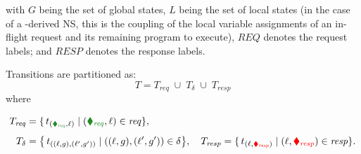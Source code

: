 

with \(G\) being the set of global states, \(L\) being the set of local states (in the case of a \toolname-derived NS, this is the coupling of the local variable assignments of an in-flight request and its remaining \toolname{} program to execute), \(\mathit{REQ}\) denotes the request labels; and \(\mathit{RESP}\) denotes the response labels.

\medskip
Transitions are partitioned as:
\[
T = T_{\mathit{req}} \;\cup\; T_{\delta}\;\cup\;T_{\mathit{resp}}
\]
where


\begin{align*}
	T_{\mathit{req}}
	&= \{\,t_{({\color{ForestGreen}\blacklozenge_{\mathit{req}}},\ell)} \mid {(\color{ForestGreen}\blacklozenge_{\mathit{req}}},\ell)\in\mathit{req}\},\\[1ex]
	T_{\delta}
	&= \bigl\{\,t_{((\ell,g),(\ell',g'))} 
	\mid ((\ell,g),(\ell',g'))\in\delta\bigr\},\quad
	T_{\mathit{resp}}
	= \{\,t_{(\ell,{\color{red}\blacklozenge_{\mathit{resp}}})} \mid (\ell,{\color{red}\blacklozenge_{\mathit{resp}}})\in\mathit{resp}\}.
\end{align*}



